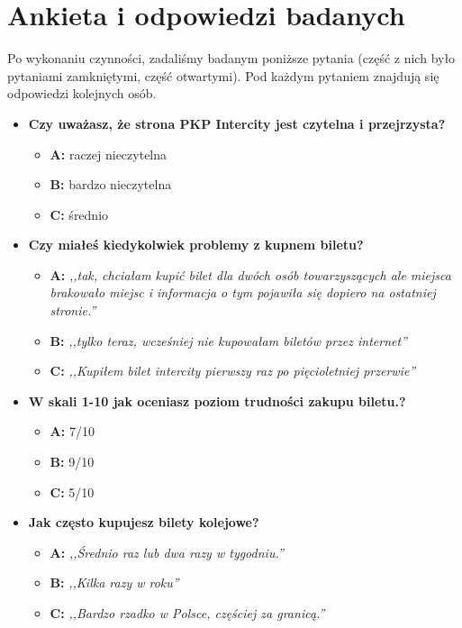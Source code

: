 \documentclass[12pt, a4paper, oneside]{report}
\begin{document}
\section*{Ankieta i odpowiedzi badanych}

Po wykonaniu czynności, zadaliśmy badanym poniższe pytania (część z nich 
było pytaniami zamkniętymi, część otwartymi). Pod każdym pytaniem znajdują
się odpowiedzi kolejnych osób.

\begin{itemize}
    \item\textbf{Czy uważasz, że strona PKP Intercity jest czytelna i 
    przejrzysta?}
    \begin{itemize}
        \item \textbf{A:} raczej nieczytelna
        \item \textbf{B:} bardzo nieczytelna
        \item \textbf{C:} średnio
    \end{itemize}

    \item\textbf{Czy miałeś kiedykolwiek problemy z kupnem biletu?}
    \begin{itemize}
        \item \textbf{A:} \textit{,,tak, chciałam kupić bilet dla dwóch osób 
        towarzyszących ale miejsca brakowało miejsc i informacja o tym pojawiła 
        się dopiero na ostatniej stronie.''}
        \item \textbf{B:} \textit{,,tylko teraz, wcześniej nie kupowałam 
        biletów przez internet''}
        \item \textbf{C:} \textit{,,Kupiłem bilet intercity pierwszy raz po 
        pięcioletniej przerwie''}
    \end{itemize}

    \item\textbf{W skali 1-10 jak oceniasz poziom trudności zakupu biletu.?}
    \begin{itemize}
        \item \textbf{A:} 7/10
        \item \textbf{B:} 9/10
        \item \textbf{C:} 5/10
    \end{itemize}

    \item\textbf{Jak często kupujesz bilety kolejowe?}
    \begin{itemize}
        \item \textbf{A:} \textit{,,Średnio raz lub dwa razy w tygodniu.''}
        \item \textbf{B:} \textit{,,Kilka razy w roku''}
        \item \textbf{C:} \textit{,,Bardzo rzadko w Polsce, częściej za 
        granicą.''}
    \end{itemize}


\end{itemize}
\end{document}
